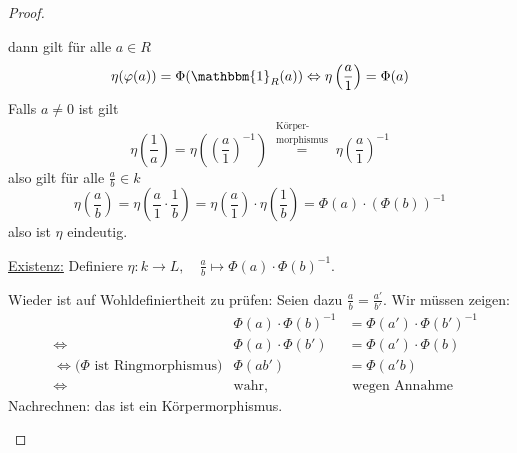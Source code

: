 \documentclass[a4paper,12pt,numbers=noenddot,parskip=full]{scrartcl}
\newcommand{\heading}{\underline}
\theoremstyle{dotless}
\theoremstyle{remark}
\begin{document}
\begin{proof}
\begin{enumerate}
\begin{center}
			\end{center}
			dann gilt für alle $a \in R$
			\begin{equation*}
				\eta(\varphi(a)) = \Phi(\mathbbm{1}_R(a)) \Leftrightarrow \eta\left(\frac{a}{1}\right) = \Phi(a)
			\end{equation*}
			Falls $a \neq 0$ ist gilt
			\begin{equation*}
				\eta\left( \frac{1}{a} \right) = \eta\left( \left( \frac{a}{1} \right)^{-1} \right) \overset{\substack{\text{Körper-} \\ \text{morphismus}}}{=} \eta \left( \frac{a}{1} \right)^{-1}
			\end{equation*}
			also gilt für alle $\frac{a}{b} \in k$
			\begin{equation*}
				\eta \left( \frac{a}{b} \right) = \eta \left( \frac{a}{1} \cdot \frac{1}{b} \right) = \eta\left( \frac{a}{1} \right) \cdot \eta \left(
				\frac{1}{b}\right) = \Phi(a) \cdot \left( \Phi(b) \right)^{-1}
			\end{equation*}
			also ist $\eta$ eindeutig.
			
			\heading{Existenz:} Definiere
			$
				\eta: k \to L, \quad \frac{a}{b} \mapsto \Phi(a) \cdot \Phi(b)^{-1}
			$.
			
			Wieder ist auf Wohldefiniertheit zu prüfen: Seien dazu $\frac{a}{b} = \frac{a'}{b'}$. Wir müssen zeigen:
			\begin{align*}
				&& \Phi(a) \cdot \Phi(b)^{-1} &= \Phi(a') \cdot \Phi(b')^{-1} \\
				&\Leftrightarrow& \Phi(a) \cdot \Phi(b') &= \Phi(a') \cdot \Phi(b) \\
				&\Leftrightarrow \text{($\Phi$ ist Ringmorphismus)}& \Phi(ab') &= \Phi(a'b) \\
				&\Leftrightarrow& \text{wahr,}& \text{ wegen Annahme}
			\end{align*}
			Nachrechnen: das ist ein Körpermorphismus.
		\end{enumerate}
	\end{proof}
\end{document}
